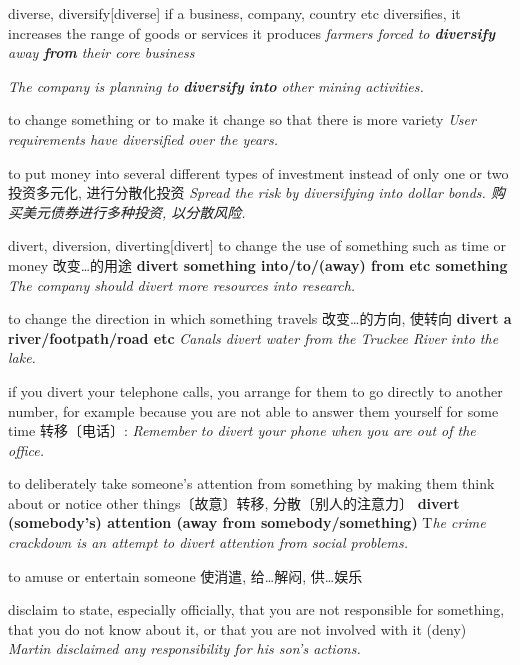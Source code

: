 \begin{DefWord}{diverse, diversify}[diverse]
    if a business, company, country etc diversifies, it increases the range of goods or services it produces
    \textit{farmers forced to \textbf{diversify} away \textbf{from} their core business}

    \textit{The company is planning to \textbf{diversify} \textbf{into} other mining activities.}

    to change something or to make it change so that there is more variety
    \textit{User requirements have diversified over the years.}

    to put money into several different types of investment instead of only one or two 投资多元化, 进行分散化投资
    \textit{Spread the risk by diversifying into dollar bonds. 购买美元债券进行多种投资, 以分散风险. }

\end{DefWord}

\begin{DefWord}{divert, diversion, diverting}[divert]
    to change the use of something such as time or money 改变…的用途
    \textbf{divert something into/to/(away) from etc something}
    \textit{The company should divert more resources into research.}

    to change the direction in which something travels 改变…的方向, 使转向
    \textbf{divert a river/footpath/road etc}
    \textit{Canals divert water from the Truckee River into the lake.}

    if you divert your telephone calls, you arrange for them to go directly to another number, for example because you are not able to answer them yourself for some time 转移〔电话〕:
    \textit{Remember to divert your phone when you are out of the office.}

    to deliberately take someone's attention from something by making them think about or notice other things〔故意〕转移, 分散〔别人的注意力〕
    \textbf{divert (somebody's) attention (away from somebody/something)}
    T\textit{he crime crackdown is an attempt to divert attention from social problems.}
 
    to amuse or entertain someone 使消遣, 给…解闷, 供…娱乐

\end{DefWord}


\begin{DefWord}{disclaim}
    to state, especially officially, that you are not responsible for something, that you do not know about it, or that you are not involved with it (deny)
    \textit{Martin disclaimed any responsibility for his son's actions.}
\end{DefWord}

